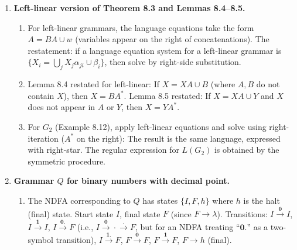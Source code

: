 \begin{enumerate}[{8.}1. ]
\begin{enumerate}
\item[$G_7$:] Equations: $S = \pmb{a}S \cup \pmb{ab}B \cup \pmb{c}C$, $B = \pmb{ab}B \cup \lambda$, $C = \pmb{c}C \cup \pmb{ca}$.
Solve $B = (\pmb{ab})^*$.
Solve $C = \pmb{c}^*\pmb{ca}$.
Substitute: $S = \pmb{a}S \cup \pmb{ab}(\pmb{ab})^* \cup \pmb{c}\cdot\pmb{c}^*\pmb{ca} = \pmb{a}S \cup \pmb{a}(\pmb{ab})^+\cup\pmb{c}^+\pmb{a}$.
By Arden's: $L(G_7) = \pmb{a}^*(\pmb{a}(\pmb{ab})^+\cup\pmb{c}^+\pmb{a}) = \pmb{a}^+(\pmb{ab})^+\cup\pmb{a}^*\pmb{c}^+\pmb{a}$.
\end{enumerate}

\item \textbf{Left-linear version of Theorem 8.3 and Lemmas 8.4--8.5.}

\begin{enumerate}
\item For left-linear grammars, the language equations take the form $A = BA \cup w$ (variables appear on the right of concatenations). The restatement: if a language equation system for a left-linear grammar is $\{X_i = \bigcup_j X_j \alpha_{ji} \cup \beta_i\}$, then solve by right-side substitution.

\item Lemma 8.4 restated for left-linear: If $X = XA \cup B$ (where $A,B$ do not contain $X$), then $X = BA^*$.
Lemma 8.5 restated: If $X = XA \cup Y$ and $X$ does not appear in $A$ or $Y$, then $X = YA^*$.

\item For $G_2$ (Example 8.12), apply left-linear equations and solve using right-iteration ($A^*$ on the right): The result is the same language, expressed with right-star. The regular expression for $L(G_2)$ is obtained by the symmetric procedure.
\end{enumerate}

\item \textbf{Grammar $Q$ for binary numbers with decimal point.}

\begin{enumerate}
\item The NDFA corresponding to $Q$ has states $\{I, F, h\}$ where $h$ is the halt (final) state. Start state $I$, final state $F$ (since $F \to \lambda$). Transitions: $I \xrightarrow{\pmb{0}} I$, $I \xrightarrow{\pmb{1}} I$, $I \xrightarrow{\pmb{0.}} F$ (i.e., $I \xrightarrow{\pmb{0}} \cdot \xrightarrow{\pmb{.}} F$, but for an NDFA treating ``$\pmb{0.}$'' as a two-symbol transition), $I \xrightarrow{\pmb{1.}} F$, $F \xrightarrow{\pmb{0}} F$, $F \xrightarrow{\pmb{1}} F$, $F \to h$ (final).


\end{enumerate}
\end{enumerate}
